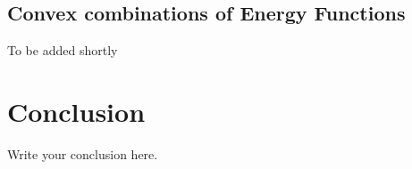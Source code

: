\documentclass{article}
\begin{document}
\subsection{Convex combinations of Energy Functions}
To be added shortly

\section{Conclusion}
Write your conclusion here.



\end{document}
